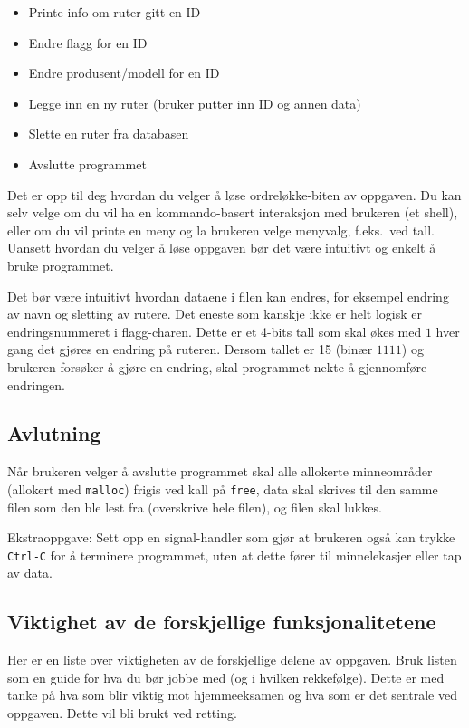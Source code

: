 \documentclass[norsk]{article}
\begin{document}
\begin{itemize}
    \item Printe info om ruter gitt en ID
    \item Endre flagg for en ID
    \item Endre produsent/modell for en ID
    \item Legge inn en ny ruter (bruker putter inn ID og annen data)
    \item Slette en ruter fra databasen
    \item Avslutte programmet
\end{itemize}

Det er opp til deg hvordan du velger å løse ordreløkke-biten av oppgaven. Du kan selv velge om du vil ha en kommando-basert interaksjon med brukeren (et shell), eller om du vil printe en meny og la brukeren velge menyvalg, f.eks.\  ved tall. Uansett hvordan du velger å løse oppgaven bør det være intuitivt og enkelt å bruke programmet.

Det bør være intuitivt hvordan dataene i filen kan endres, for eksempel endring av navn og sletting av rutere. Det eneste som kanskje ikke er helt logisk er endringsnummeret i flagg-charen. Dette er et 4-bits tall som skal økes med $1$ hver gang det gjøres en endring på ruteren. Dersom tallet er 15 (binær $1111$) og brukeren forsøker å gjøre en endring, skal programmet nekte å gjennomføre endringen.

\subsection*{Avlutning}
Når brukeren velger å avslutte programmet skal alle allokerte minneområder (allokert med \texttt{malloc}) frigis ved kall på \texttt{free}, data skal skrives til den samme filen som den ble lest fra (overskrive hele filen), og filen skal lukkes.

Ekstraoppgave: Sett opp en signal-handler som gjør at brukeren også kan trykke \texttt{Ctrl-C} for å terminere programmet, uten at dette fører til minnelekasjer eller tap av data.

\subsection*{Viktighet av de forskjellige funksjonalitetene}

Her er en liste over viktigheten av de forskjellige delene av oppgaven. Bruk listen som en guide for hva du bør jobbe med (og i hvilken rekkefølge). Dette er med tanke på hva som blir viktig mot hjemmeeksamen og hva som er det sentrale ved oppgaven. Dette vil bli brukt ved retting.
\end{document}
